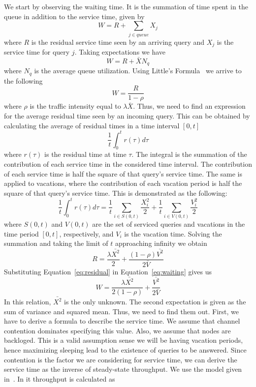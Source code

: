 \documentclass[10pt, conference]{IEEEtran}
\begin{document}
We start by observing the waiting time. It is the summation of time spent in the queue in addition to the service time, given by
\begin{equation}
W = R + \sum_{j \in queue} X_j
\end{equation}
where $R$ is the residual service time seen by an arriving query and $X_j$ is the service time for query $j$. Taking expectations we have
\begin{equation}
W = R + \bar{X}N_q
\end{equation}
where $N_q$ is the average queue utilization. Using Little's Formula~\cite{Littles} we arrive to the following
\begin{equation}
\label{eq:waiting}
W = \frac{R}{1 - \rho}
\end{equation}
where $\rho$ is the traffic intensity equal to $\lambda\bar{X}$. Thus, we need to find an expression for the average residual time seen by an incoming query. This can be obtained by calculating the average of residual times in a time interval $[0, t]$
\begin{equation}
\frac{1}{t} \int_0^t r(\tau) d\tau
\end{equation}
where $r(\tau)$ is the residual time at time $\tau$. The integral is the summation of the contribution of each service time in the considered time interval. The contribution of each service time is half the square of that query's service time. The same is applied to vacations, where the contribution of each vacation period is half the square of that query's service time. This is demonstrated as the following:
\begin{equation}
\frac{1}{t} \int_0^t r(\tau) d\tau = \frac{1}{t} \sum_{i \in S(0,t)} \frac{X_i^2}{2} + \frac{1}{t} \sum_{i \in V(0,t)} \frac{V_i^2}{2}
\end{equation}
where $S(0,t)$ and $V(0,t)$ are the set of serviced queries and vacations in the time period $[0, t]$, respectively, and $V_i$ is the vacation time. Solving the summation and taking the limit of $t$ approaching infinity we obtain
\begin{equation}
\label{eq:residual}
R = \frac{\lambda\bar{X^2}}{2} + \frac{(1-\rho)\bar{V^2}}{2\bar{V}}
\end{equation}
Substituting Equation~\ref{eq:residual} in Equation~\ref{eq:waiting} gives us
\begin{equation}
\label{eq:waiting_2}
W = \frac{\lambda\bar{X^2}}{2 (1-\rho)} + \frac{\bar{V^2}}{2\bar{V}}
\end{equation}
In this relation, $\bar{X^2}$ is the only unknown. The second expectation is given as the sum of variance and squared mean. Thus, we need to find them out. First, we have to derive a formula to describe the service time. We assume that channel contention dominates specifying this value. Also, we assume that nodes are backloged. This is a valid assumption sense we will be having vacation periods, hence maximizing sleeping lead to the existence of queries to be answered. Since contention is the factor we are considering for service time, we can derive the service time as the inverse of steady-state throughput. We use the model given in~\cite{802.15.4_model}. In it throughput is calculated as
\end{document}
